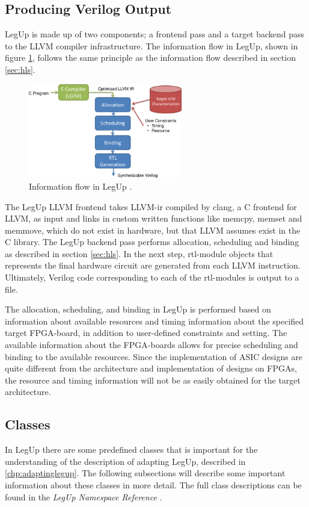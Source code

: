\subsection{Producing Verilog Output}
LegUp is made up of two components; a frontend pass and a target backend pass to the LLVM compiler infrastructure. 
The information flow in LegUp, shown in figure \ref{fig:legupflow}, follows the same principle as the information flow described in section \ref{sec:hls}.
\begin{figure}[hbpt]
\centering
\includegraphics[width=0.6\textwidth]{../figs/LegUpFlow.png}
\caption{\label{fig:legupflow}Information flow in LegUp \cite{legupmaual}.}
\end{figure}
The LegUp LLVM frontend takes LLVM-\gls{ir} compiled by clang, a C frontend for LLVM, as input and links in custom written functions like memcpy, memset and memmove, which do not exist in hardware, but that LLVM assumes exist in the C library. 
The LegUp backend pass performs allocation, scheduling and binding as described in section \ref{sec:hls}. In the next step, \gls{rtl}-module objects that represents the final hardware circuit are generated from each LLVM instruction. Ultimately, Verilog code corresponding to each of the \gls{rtl}-modules is output to a file.

The allocation, scheduling, and binding in LegUp is performed based on information about available resources and timing information about the specified target FPGA-board, in addition to user-defined constraints and setting. The available information about the FPGA-boards allows for precise scheduling and binding to the available resources. Since the implementation of ASIC designs are quite different from the architecture and implementation of designs on FPGAs, the resource and timing information will not be as easily obtained for the target architecture. 

\subsection{\label{sec:legupclasses}Classes}
In LegUp there are some predefined classes that is important for the understanding of the description of adapting LegUp, described in \cref{chp:adaptinglegup}. The following subsections will describe some important information about these classes in more detail. The full class descriptions can be found in the \textit{LegUp Namespace Reference} \cite{legupclassref}.
